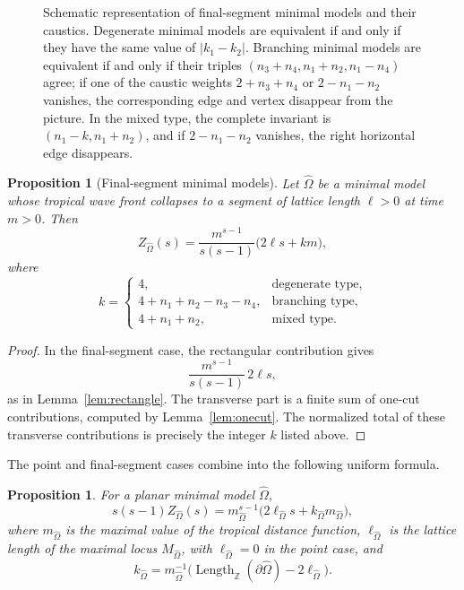 \documentclass[a4paper,american,11pt]{amsart}
\theoremstyle{plain}
\newtheorem{proposition}[theorem]{Proposition}
\theoremstyle{definition}
\newcommand{\Z}{\mathbb Z}
\DeclareMathOperator{\Length}{Length}
\begin{document}
\begin{figure}[htbp]
    \caption{\small Schematic representation of final-segment minimal models
    and their caustics. Degenerate minimal models are equivalent if and only
    if they have the same value of \(|k_1-k_2|\). Branching minimal models
    are equivalent if and only if their triples
    \((n_3+n_4,n_1+n_2,n_1-n_4)\) agree; if one of the caustic weights
    \(2+n_3+n_4\) or \(2-n_1-n_2\) vanishes, the corresponding edge and
    vertex disappear from the picture. In the mixed type, the complete
    invariant is \((n_1-k,n_1+n_2)\), and if \(2-n_1-n_2\) vanishes, the
    right horizontal edge disappears.}
    \label{fig:segmentwf}
\end{figure}

\begin{proposition}[Final-segment minimal models]
\label{prop:segment-minimal-models}
Let \(\widehat\Omega\) be a minimal model whose tropical wave front collapses
to a segment of lattice length \(\ell>0\) at time \(m>0\). Then
\[
Z_{\widehat\Omega}(s)
=
\frac{m^{s-1}}{s(s-1)}
\bigl(2\ell s+k m\bigr),
\]
where
\[
k=
\begin{cases}
4, & \text{degenerate type},\\
4+n_1+n_2-n_3-n_4, & \text{branching type},\\
4+n_1+n_2, & \text{mixed type}.
\end{cases}
\]
\end{proposition}

\begin{proof}
In the final-segment case, the rectangular contribution gives
\[
\frac{m^{s-1}}{s(s-1)}\,2\ell s,
\]
as in Lemma~\ref{lem:rectangle}. The transverse part is a finite sum of
one-cut contributions, computed by Lemma~\ref{lem:onecut}. The normalized
total of these transverse contributions is precisely the integer \(k\) listed
above.
\end{proof}

The point and final-segment cases combine into the following uniform formula.

\begin{proposition}\label{prop:minmodzeta}
For a planar minimal model \(\widehat\Omega\),
\[
s(s-1)Z_{\widehat\Omega}(s)
=
m_{\widehat\Omega}^{s-1}
\bigl(
2\ell_{\widehat\Omega}s
+
k_{\widehat\Omega}m_{\widehat\Omega}
\bigr),
\]
where \(m_{\widehat\Omega}\) is the maximal value of the tropical distance
function, \(\ell_{\widehat\Omega}\) is the lattice length of the maximal locus
\(M_{\widehat\Omega}\), with \(\ell_{\widehat\Omega}=0\) in the point case,
and
\[
k_{\widehat\Omega}
=
m_{\widehat\Omega}^{-1}
\bigl(
\Length_{\Z}(\partial\widehat\Omega)
-
2\ell_{\widehat\Omega}
\bigr).
\]
\end{proposition}
\end{document}
